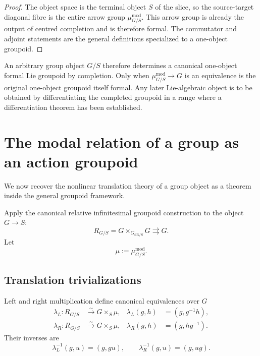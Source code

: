 \begin{proof}
The object space is the terminal object $S$ of the slice, so the source-target
diagonal fibre is the entire arrow group
$\mu^{\mathrm{mod}}_{G/S}$.  This arrow group is already the output of centred
completion and is therefore formal.  The commutator and adjoint statements are
the general definitions specialized to a one-object groupoid.
\end{proof}

\begin{remark}
An arbitrary group object $G/S$ therefore determines a canonical one-object
formal Lie groupoid by completion.  Only when
$\mu^{\mathrm{mod}}_{G/S}\to G$ is an equivalence is the original
one-object groupoid itself formal.  Any later Lie-algebraic object is to be
obtained by differentiating the completed groupoid in a range where a
differentiation theorem has been established.
\end{remark}

\section{The modal relation of a group as an action groupoid}
\label{sec:flg-group-translation}

We now recover the nonlinear translation theory of a group object as a theorem
inside the general groupoid framework.

Apply the canonical relative infinitesimal groupoid construction to the object
$G\to S$:
\[
    R_{G/S}
    =
    G\times_{G_{\mathrm{dR}/S}}G
    \rightrightarrows G.
\]
Let
\[
    \mu:=\mu^{\mathrm{mod}}_{G/S}.
\]

\subsection{Translation trivializations}

\begin{theorem}
\label{thm:group-translation}
Left and right multiplication define canonical equivalences over $G$
\[
\begin{aligned}
    \lambda_L:
    R_{G/S}
    &\xrightarrow{\sim}
    G\times_S\mu,
    &
    \lambda_L(g,h)&=(g,g^{-1}h),
\\
    \lambda_R:
    R_{G/S}
    &\xrightarrow{\sim}
    G\times_S\mu,
    &
    \lambda_R(g,h)&=(g,hg^{-1}).
\end{aligned}
\]
Their inverses are
\[
    \lambda_L^{-1}(g,u)=(g,gu),
    \qquad
    \lambda_R^{-1}(g,u)=(g,ug).
\]
\end{theorem}

